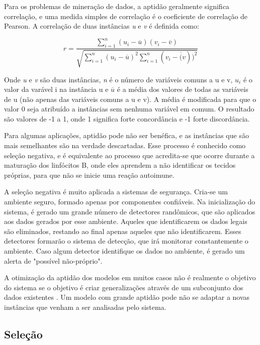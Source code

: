 Para os problemas de mineração de dados, a aptidão geralmente significa correlação, e uma medida simples de correlação é o coeficiente de correlação de Pearson. A correlação de duas instâncias \emph{u} e \emph{v} é definida como:

\begin{equation}
r=\frac{
    \sum\limits_{i=1}^{n}
        (u_i-\overline{u})
        (v_i-\overline{v})
    }
    {\sqrt{
        \sum\limits_{i=1}^{n}
            (u_i-\overline{u})^2
        \sum\limits_{i=1}^{n}
            (v_i-\overline(v))^2
        }
    }
\end{equation}

Onde \emph{u} e \emph{v} são duas instâncias, \emph{n} é o número de variáveis comuns a u e v, \emph{$u_i$} é o valor da varável i na instância u e \emph{$\overline{u}$} é a média dos valores de todas as variáveis de u (não apenas das variáveis comuns a u e v). A média é modificada para que o valor 0 seja atribuído a instâncias sem nenhuma variável em comum. O resultado são valores de -1 a 1, onde 1 significa forte concordância e -1 forte discordância.

Para algumas aplicações, aptidão pode não ser benéfica, e as instâncias que são mais semelhantes são na verdade descartadas. Esse processo é conhecido como seleção negativa, e é equivalente ao processo que acredita-se que ocorre durante a maturação dos linfócitos B, onde eles aprendem a não identificar os tecidos próprias, para que não se inicie uma reação autoimune.

A seleção negativa é muito aplicada a sistemas de segurança. Cria-se um ambiente seguro, formado apenas por componentes confiáveis. Na inicialização do sistema, é gerado um grande número de detectores randômicos, que são aplicados aos dados gerados por esse ambiente. Aqueles que identificarem os dados legais são eliminados, restando ao final apenas aqueles que não identificarem. Esses detectores formarão o sistema de detecção, que irá monitorar constantemente o ambiente. Caso algum detector identifique os dados no ambiente, é gerado um alerta de "possível não-próprio".

A otimização da aptidão dos modelos em muitos casos não é realmente o objetivo do sistema se o objetivo é criar generalizações através de um subconjunto dos dados existentes \cite{Hand2001}. Um modelo com grande aptidão pode não se adaptar a novas instâncias que venham a ser analisadas pelo sistema.

\subsection{Seleção}

